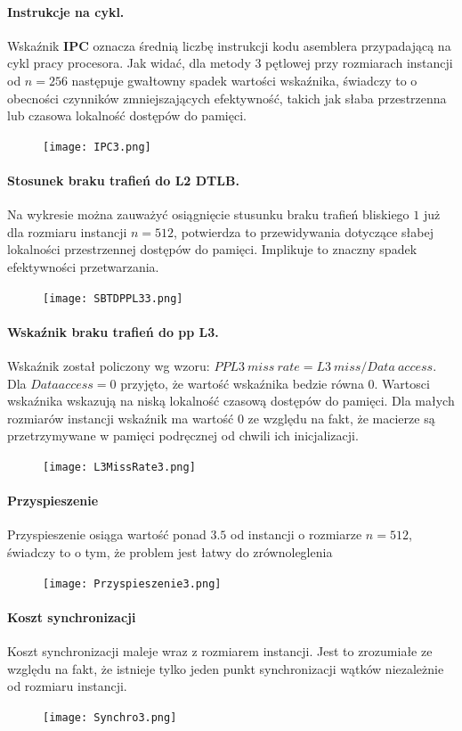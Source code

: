 \documentclass{scrartcl}
\begin{document}
\paragraph{Instrukcje na cykl.} Wskaźnik \textbf{IPC} oznacza średnią liczbę instrukcji kodu asemblera przypadającą na cykl pracy procesora. Jak widać, dla metody 3 pętlowej przy rozmiarach instancji od $n = 256$ następuje gwałtowny spadek wartości wskaźnika, świadczy to o obecności czynników zmniejszających efektywność, takich jak słaba przestrzenna lub czasowa lokalność dostępów do pamięci.
\begin{figure}[H]
\texttt{[image: IPC3.png]}\\
\end{figure}
\paragraph{Stosunek braku trafień do L2 DTLB.} Na wykresie można zauważyć osiągnięcie stusunku braku trafień bliskiego $1$ już dla rozmiaru instancji $n = 512$, potwierdza to przewidywania dotyczące słabej lokalności przestrzennej dostępów do pamięci. Implikuje to znaczny spadek efektywności przetwarzania.
\begin{figure}[H]
\texttt{[image: SBTDPPL33.png]}\\
\end{figure}
\paragraph{Wskaźnik braku trafień do pp L3.} Wskaźnik został policzony wg wzoru: $PPL3\ miss\ rate = L3\ miss / Data\ access$. Dla $Data access = 0$ przyjęto, że wartość wskaźnika bedzie równa 0. Wartosci wskaźnika wskazują na niską lokalność czasową dostępów do pamięci. Dla małych rozmiarów instancji wskaźnik ma wartość 0 ze względu na fakt, że macierze są przetrzymywane w pamięci podręcznej od chwili ich inicjalizacji.
\begin{figure}[H]
\texttt{[image: L3MissRate3.png]}
\end{figure}
\paragraph{Przyspieszenie} Przyspieszenie osiąga wartość ponad $3.5$ od instancji o rozmiarze $n = 512$, świadczy to o tym, że problem jest łatwy do zrównoleglenia
\begin{figure}[H]
\texttt{[image: Przyspieszenie3.png]}
\end{figure}
\paragraph{Koszt synchronizacji} Koszt synchronizacji maleje wraz z rozmiarem instancji. Jest to zrozumiałe ze względu na fakt, że istnieje tylko jeden punkt synchronizacji wątków niezależnie od rozmiaru instancji.
\begin{figure}[H]
\texttt{[image: Synchro3.png]}
\end{figure}
\end{document}
